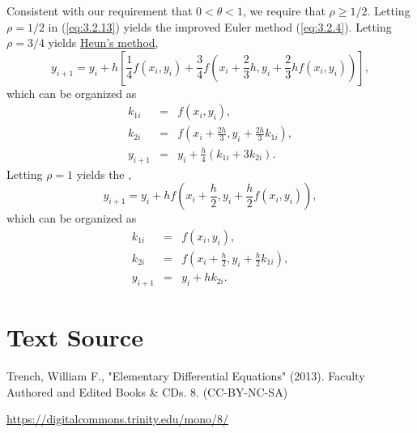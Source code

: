 \documentclass{ximera}
\begin{document}
Consistent with our requirement that $0<\theta<1$, we require that
$\rho\geq 1/2$. Letting $\rho=1/2$ in (\ref{eq:3.2.13}) yields the improved
Euler method (\ref{eq:3.2.4}). Letting $\rho=3/4$ yields
\href{http://www-history.mcs.st-and.ac.uk/Mathematicians/Heun.html}{Heun's method},
$$
y_{i+1}=y_i+h\left[\frac{1}{4}f(x_i,y_i)+\frac{3}{4}f\left(
x_i+\frac{2}{3}h,y_i+\frac{2}{3}hf(x_i,y_i)\right)\right],
$$
which can be organized as
\begin{eqnarray*}
k_{1i}&=&f(x_i,y_i),\\
k_{2i}&=&f\left(x_i+\frac{2h}{3},
y_i+\frac{2h}{3}k_{1i}\right),\\
y_{i+1}&=&y_i+\frac{h}{4}(k_{1i}+3k_{2i}).
\end{eqnarray*}
Letting $\rho=1$ yields the ,
$$
y_{i+1}=y_i+hf\left(x_i+\frac{h}{2},y_i+\frac{h}{2}f(x_i,y_i)\right),
$$
which can be organized as
\begin{eqnarray*}
k_{1i}&=&f(x_i,y_i),\\
k_{2i}&=&f\left(x_i+\frac{h}{2},
y_i+\frac{h}{2}k_{1i}\right),\\
y_{i+1}&=&y_i+hk_{2i}.
\end{eqnarray*}




\section*{Text Source}
Trench, William F., "Elementary Differential Equations" (2013). Faculty Authored and Edited Books \& CDs. 8. (CC-BY-NC-SA)

\href{https://digitalcommons.trinity.edu/mono/8/}{https://digitalcommons.trinity.edu/mono/8/}
\end{document}
